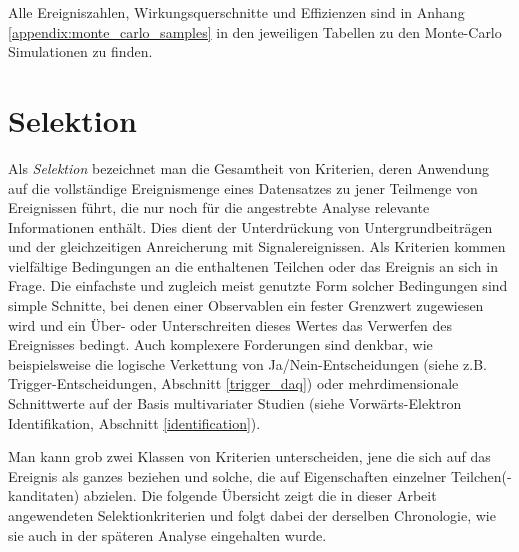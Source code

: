 Alle Ereigniszahlen, Wirkungsquerschnitte und Effizienzen sind in Anhang
\ref{appendix:monte_carlo_samples} in den jeweiligen Tabellen zu den
Monte-Carlo Simulationen zu finden.



\section{Selektion}
\label{data_sim_selection:selection}


Als \textit{Selektion} bezeichnet man die Gesamtheit von Kriterien, deren
Anwendung auf die vollständige Ereignismenge eines Datensatzes zu jener
Teilmenge von Ereignissen führt, die nur noch für die angestrebte Analyse
relevante Informationen enthält. Dies dient der Unterdrückung von
Untergrundbeiträgen und der gleichzeitigen Anreicherung mit Signalereignissen.
Als Kriterien kommen vielfältige Bedingungen an die enthaltenen Teilchen oder
das Ereignis an sich in Frage. Die einfachste und zugleich meist genutzte Form
solcher Bedingungen sind simple Schnitte, bei denen einer Observablen ein
fester Grenzwert zugewiesen wird und ein Über- oder Unterschreiten dieses
Wertes das Verwerfen des Ereignisses bedingt. Auch komplexere Forderungen sind
denkbar, wie beispielsweise die logische Verkettung von Ja/Nein-Entscheidungen
(siehe z.B. Trigger-Entscheidungen, Abschnitt \ref{trigger_daq})
oder mehrdimensionale Schnittwerte auf der Basis multivariater Studien (siehe
Vorwärts-Elektron Identifikation, Abschnitt \ref{identification}).

Man kann grob zwei Klassen von Kriterien unterscheiden, jene die sich auf das
Ereignis als ganzes beziehen und solche, die auf Eigenschaften einzelner
Teilchen(-kanditaten) abzielen. Die folgende Übersicht zeigt die in dieser
Arbeit angewendeten Selektionkriterien und folgt dabei der derselben
Chronologie, wie sie auch in der späteren Analyse eingehalten wurde.

